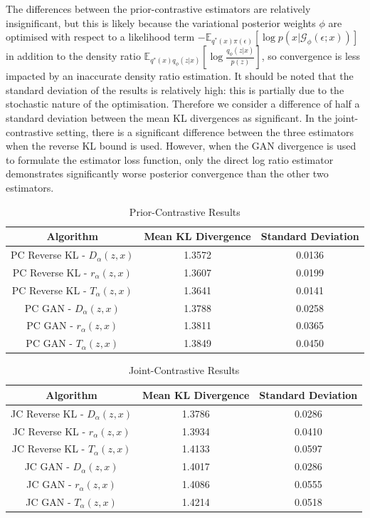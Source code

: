 \documentclass[honours,12pt]{unswthesis}
\newcommand{\E}{\mathbb{E}}
\numberwithin{equation}{section}
\theoremstyle{definition}
\begin{document}
The differences between the prior-contrastive estimators are relatively insignificant, but this is likely because the variational posterior weights $\phi$ are optimised with respect to a likelihood term $-\E_{q^*(x)\pi(\epsilon)}[\log p(x|\mathcal{G}_\phi(\epsilon;x))]$ in addition to the density ratio $\E_{q^*(x)q_\phi(z|x)}\left[\log \frac{q_\phi(z|x)}{p(z)}\right]$, so convergence is less impacted by an inaccurate density ratio estimation. It should be noted that the standard deviation of the results is relatively high: this is partially due to the stochastic nature of the optimisation. Therefore we consider a difference of half a standard deviation between the mean KL divergences as significant. In the joint-contrastive setting, there is a significant difference between the three estimators when the reverse KL bound is used. However, when the GAN divergence is used to formulate the estimator loss function, only the direct log ratio estimator demonstrates significantly worse posterior convergence than the other two estimators.
\begin{table}[h]
\centering
\begin{tabular}{|c|c|c|}
\hline
Algorithm & Mean KL Divergence & Standard Deviation\\
\hline
PC Reverse KL - $D_\alpha(z,x)$ & 1.3572 & 0.0136\\
\hline
PC Reverse KL - $r_\alpha(z,x)$ & 1.3607 & 0.0199\\
\hline
PC Reverse KL - $T_\alpha(z,x)$ & 1.3641 & 0.0141\\
\hline
PC GAN - $D_\alpha(z,x)$ & 1.3788 & 0.0258\\
\hline
PC GAN - $r_\alpha(z,x)$ & 1.3811 & 0.0365\\
\hline
PC GAN - $T_\alpha(z,x)$ & 1.3849 & 0.0450\\
\hline
\end{tabular}
\caption{Prior-Contrastive Results}
\end{table}
\begin{table}[h]
\centering
\begin{tabular}{|c|c|c|}
\hline
Algorithm & Mean KL Divergence & Standard Deviation\\
\hline
JC Reverse KL - $D_\alpha(z,x)$ & 1.3786 & 0.0286\\
\hline
JC Reverse KL - $r_\alpha(z,x)$ & 1.3934 & 0.0410\\
\hline
JC Reverse KL - $T_\alpha(z,x)$ & 1.4133 & 0.0597\\
\hline
JC GAN - $D_\alpha(z,x)$ & 1.4017 & 0.0286\\
\hline
JC GAN - $r_\alpha(z,x)$ & 1.4086 & 0.0555\\
\hline
JC GAN - $T_\alpha(z,x)$ & 1.4214 & 0.0518\\
\hline
\end{tabular}
\caption{Joint-Contrastive Results}
\end{table}
\end{document}
